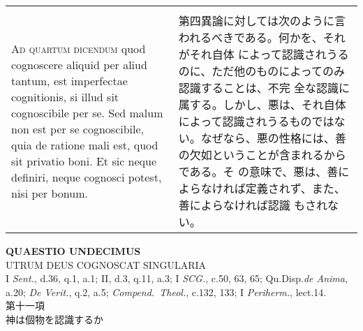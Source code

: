 \documentclass[10pt]{jsarticle} %
\begin{document}
\begin{longtable}{p{21em}p{21em}}
\\
\\

{\scshape Ad quartum dicendum} quod cognoscere aliquid per aliud
tantum, est imperfectae cognitionis, si illud sit cognoscibile per
se. Sed malum non est per se cognoscibile, quia de ratione mali est,
quod sit privatio boni. Et sic neque definiri, neque cognosci potest,
nisi per bonum.

&

第四異論に対しては次のように言われるべきである。何かを、それがそれ自体
によって認識されうるのに、ただ他のものによってのみ認識することは、不完
全な認識に属する。しかし、悪は、それ自体によって認識されうるものではな
い。なぜなら、悪の性格には、善の欠如ということが含まれるからである。そ
の意味で、悪は、善によらなければ定義されず、また、善によらなければ認識
もされない。


\end{longtable}
\newpage


\begin{center}
{\Large {\bf QUAESTIO UNDECIMUS}}\\ {\large UTRUM DEUS COGNOSCAT
SINGULARIA}\\ {\footnotesize I {\itshape Sent.}, d.36, q.1, a.1;
II, d.3, q.11, a.3; I {\itshape SCG.}, c.50, 63, 65;
Qu.Disp.{\itshape de Anima}, a.20; {\itshape De Verit.}, q.2,
a.5; {\itshape Compend.~Theol.}, c.132, 133; I {\itshape Periherm.},
lect.14.}\\ {\Large 第十一項\\神は個物を認識するか}
\end{center}
\end{document}
